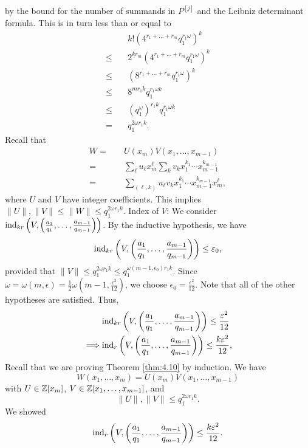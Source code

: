 \documentclass{Vorlesungstemplate_English} %
\begin{document}
\begin{pf}
  by the bound for the number of summands in $P^{[j]}$ {\color{blue} and the Leibniz determinant formula}. This is in turn less than or equal to
  \begin{align*}
    & k!\left(4^{r_1+\dots+r_m}q_1^{r_1\omega}\right)^k \\
    \leq \quad & 2^{kr_m}\left(4^{r_1+\dots+r_m}q_1^{r_1\omega}\right)^k \\
    \leq \quad & \left(8^{r_1+\dots+r_m}q_1^{r_1\omega}\right)^k \\
    \leq \quad & 8^{mr_1k}q_1^{r_1\omega k} \\
    \leq \quad & (q_1^\omega)^{r_1k}q_1^{r_1\omega k} \\
    = \quad & q_1^{2\omega r_1k}.
  \end{align*}
  Recall that
  \begin{align*}
    W = \quad & U(x_m)V(x_1, \dots, x_{m-1}) \\
    = \quad & \sum_{\ell} u_{\ell}x_m^{\ell}\sum_{k}v_kx_1^{k_1}\cdots x_{m-1}^{k_{m-1}} \\
    = \quad & \sum_{(\ell, k)} u_{\ell}v_kx_1^{k_1}\cdots x_{m-1}^{k_{m-1}}x_m^{\ell},
  \end{align*}
  {\color{blue} where $U$ and $V$ have integer coefficients.}
  This implies $\|U\|, \|V\| \leq \|W\| \leq q_1^{2\omega r_1k}$.
  Index of $V$: We consider $\text{ind}_{kr}\left(V, \left(\frac{a_1}{q_1}, \dots, \frac{a_{m-1}}{q_{m-1}}\right)\right)$. By the inductive hypothesis, we have
  \begin{align*}
    \text{ind}_{kr}\left(V, \left(\frac{a_1}{q_1}, \dots, \frac{a_{m-1}}{q_{m-1}}\right)\right) \leq \varepsilon_0,
  \end{align*}
  provided that $\|V\| \leq q_1^{2\omega r_1k} \leq q_1^{\omega(m-1,\epsilon_0)r_1k}$. Since $\omega = \omega(m,\epsilon) = \frac{1}{2}\omega\left(m-1, \frac{\epsilon^2}{12}\right)$, we choose $\epsilon_0 = \frac{\epsilon^2}{12}$. Note that all of the other hypotheses are satisfied. Thus,
  \begin{align*}
    & \text{ind}_{kr}\left(V, \left(\frac{a_1}{q_1}, \dots, \frac{a_{m-1}}{q_{m-1}}\right)\right) \leq \frac{\varepsilon^2}{12} \\
    \implies & \text{ind}_r\left(V, \left(\frac{a_1}{q_1}, \dots, \frac{a_{m-1}}{q_{m-1}}\right)\right) \leq \frac{k\varepsilon^2}{12},
  \end{align*}
  Recall that we are proving Theorem \ref{thm:4.10} by induction. We have
  \[
    W(x_1,\dots,x_m)=U(x_m)V(x_1,\dots,x_{m-1})
  \]
  with $U\in\mathbb{Z}[x_m]$, $V\in\mathbb{Z}[x_1,\dots,x_{m-1}]$, and
  \[
    \|U\|,\|V\|\leq q_1^{2\omega r_1k}.
  \]
  We showed
  \[
    \text{ind}_r\left(V,\left(\frac{a_1}{q_1},\dots,\frac{a_{m-1}}{q_{m-1}}\right)\right)\leq \frac{k\varepsilon^2}{12}.
  \]


\end{pf}
\end{document}
